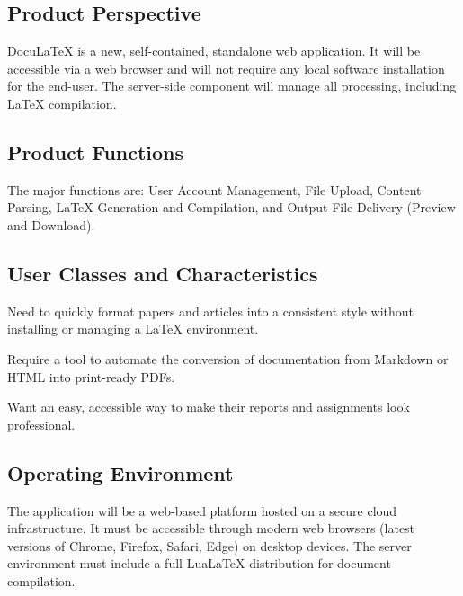 \documentclass[a4paper, 11pt]{article}
\begin{document}
\subsection{Product Perspective}
DocuLaTeX is a new, self-contained, standalone web application. It will be accessible via a web browser and will not require any local software installation for the end-user. The server-side component will manage all processing, including LaTeX compilation.

\subsection{Product Functions}
The major functions are: User Account Management, File Upload, Content Parsing, LaTeX Generation and Compilation, and Output File Delivery (Preview and Download).

\subsection{User Classes and Characteristics}
\begin{cardcontainer}[title={User Classes}]
\begin{description}[style=unboxed]
    \item[\poppinssemibold Academics \& Researchers:] Need to quickly format papers and articles into a consistent style without installing or managing a LaTeX environment.
    \item[\poppinssemibold Technical Writers:] Require a tool to automate the conversion of documentation from Markdown or HTML into print-ready PDFs.
    \item[\poppinssemibold Students:] Want an easy, accessible way to make their reports and assignments look professional.
\end{description}
\end{cardcontainer}

\subsection{Operating Environment}
The application will be a web-based platform hosted on a secure cloud infrastructure. It must be accessible through modern web browsers (latest versions of Chrome, Firefox, Safari, Edge) on desktop devices. The server environment must include a full LuaLaTeX distribution for document compilation.
\end{document}
